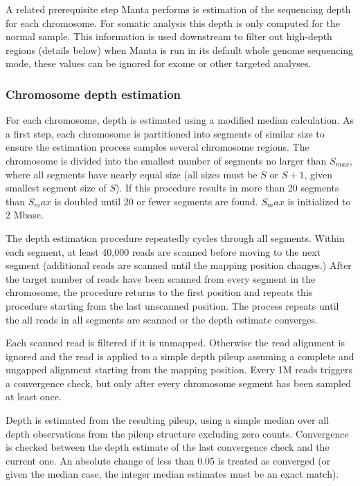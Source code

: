 \documentclass{article}
\begin{document}
A related prerequisite step Manta performs is estimation of the sequencing depth for each chromosome. For somatic analysis this depth is only computed for the normal sample. This information is used downstream to filter out high-depth regions (details below) when Manta is run in its default whole genome sequencing mode, these values can be ignored for exome or other targeted analyses.

\subsubsection{Chromosome depth estimation}

For each chromosome, depth is estimated using a modified median calculation. As a first step, each chromosome is partitioned into segments of similar size to ensure the estimation process samples several chromosome regions. The chromosome is divided into the smallest number of segments no larger than $S_{max}$, where all segments have nearly equal size (all sizes must be $S$ or $S+1$, given smallest segment size of $S$). If this procedure results in more than 20 segments than $S_max$ is doubled until 20 or fewer segments are found. $S_max$ is initialized to 2 Mbase.

The depth estimation procedure repeatedly cycles through all segments. Within each segment, at least 40,000 reads are scanned before moving to the next segment (additional reads are scanned until the mapping position changes.) After the target number of reads have been scanned from every segment in the chromosome, the procedure returns to the first position and repeats this procedure starting from the last unscanned position. The process repeats until the all reads in all segments are scanned or the depth estimate converges.

Each scanned read is filtered if it is unmapped. Otherwise the read alignment is ignored and the read is applied to a simple depth pileup assuming a complete and ungapped alignment starting from the mapping position. Every 1M reads triggers a convergence check, but only after every chromosome segment has been sampled at least once.

Depth is estimated from the resulting pileup, using a simple median over all depth observations from the pileup structure excluding zero counts. Convergence is checked between the depth estimate of the last convergence check and the current one. An absolute change of less than 0.05 is treated as converged (or given the median case, the integer median estimates must be an exact match).
\end{document}
